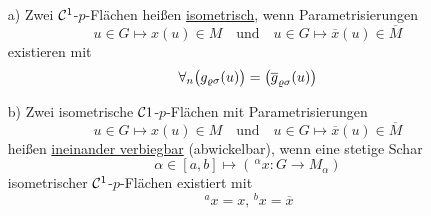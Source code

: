 \begin{definition}\(\)
\begin{enumerate}
 \item[a)] Zwei \(\mathcal{C}^1\)-\(p\)-Flächen heißen \uline{isometrisch}, wenn Parametrisierungen
 \[
  u \in G \mapsto x(u) \in M \quad \text{und} \quad u \in G \mapsto \overline x(u) \in \overline M
 \]
 existieren mit 
 \[
  \forall_n \big(g_{\varrho \sigma} (u) \big) = \big(\overline g_{\varrho \sigma} (u) \big)
 \]
 \item[b)] Zwei isometrische \(\mathcal{C}1\)-\(p\)-Flächen mit Parametrisierungen
 \[
  u \in G \mapsto x(u) \in M \quad \text{und}\quad u \in G \mapsto \overline x (u) \in \overline M
 \]
 heißen \uline{ineinander verbiegbar} (abwickelbar), wenn eine stetige Schar
 \[
  \alpha \in [a,b] \mapsto (\,^\alpha x \colon G \to M_\alpha)
 \]
 isometrischer \(\mathcal{C}^1\)-\(p\)-Flächen existiert mit
 \[
  \,^a x = x, \,^b x = \overline x
 \]

\end{enumerate}

\end{definition}
